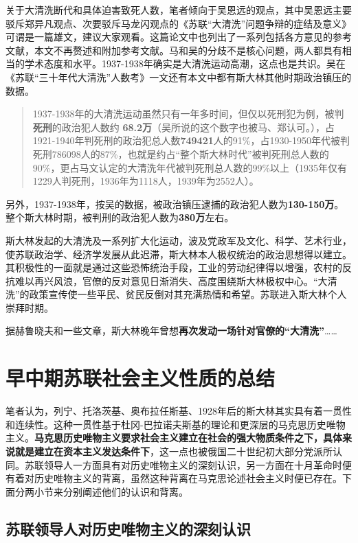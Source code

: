 \begin{enumerate}
  关于大清洗断代和具体迫害致死人数，笔者倾向于吴恩远的观点，其中吴恩远主要驳斥郑异凡观点、次要驳斥马龙闪观点的《苏联“大清洗”问题争辩的症结及意义》可谓是一篇雄文，建议大家观看。这篇论文中也列出了一系列包括各方意见的参考文献，本文不再赘述和附加参考文献。马和吴的分歧不是核心问题，两人都具有相当的学术态度和水平。1937-1938年确实是大清洗运动高潮，这点也是共识。吴在《苏联“三十年代大清洗”人数考》一文还有本文中都有斯大林其他时期政治镇压的数据。
  \begin{quotation} 1937-1938年的大清洗运动虽然只有一年多时间，但仅以死刑犯为例，被判\textbf{死刑}的政治犯人数约 \textbf{68.2万}（吴所说的这个数字也被马、郑认可。），占1921-1940年判死刑的政治犯总人数\textbf{749421}人的91\%，占1930-1950年代被判死刑786098人的87\%，也就是约占“整个斯大林时代”被判死刑总人数的90\%，更占马文认定的大清洗年代被判死刑总人数的99\%以上（1935年仅有1229人判死刑，1936年为1118人，1939年为2552人）。
  \end{quotation}另外，1937-1938年，按吴的数据，被政治镇压逮捕的政治犯人数为\textbf{130-150万}。整个斯大林时期，被判刑的政治犯人数为\textbf{380万}左右。\cite{wuenyuanzhengbian}

  斯大林发起的大清洗及一系列扩大化运动，波及党政军及文化、科学、艺术行业，使苏联政治学、经济学发展从此迟滞，斯大林本人极权统治的政治思想得以建立。其积极性的一面就是通过这些恐怖统治手段，工业的劳动纪律得以增强，农村的反抗难以再兴风浪，官僚的反对意见日渐消失、高度围绕斯大林极权中心。“大清洗”的政策宣传使一些平民、贫民反倒对其充满热情和希望。苏联进入斯大林个人崇拜时期。

  据赫鲁晓夫和一些文章，斯大林晚年曾想\textbf{再次发动一场针对官僚的“大清洗”}……
\end{enumerate}

\section{早中期苏联社会主义性质的总结}

笔者认为，列宁、托洛茨基、奥布拉任斯基、1928年后的斯大林其实具有着一贯性和连续性。这种一贯性基于杜冈-巴拉诺夫斯基的理论和更深层的马克思历史唯物主义。\textbf{马克思历史唯物主义要求社会主义建立在社会的强大物质条件之下，具体来说就是建立在资本主义发达条件下}，这一点也被俄国二十世纪初大部分党派所认同。苏联领导人一方面具有对历史唯物主义的深刻认识，另一方面在十月革命时便有着对历史唯物主义的背离，虽然这种背离在马克思论述社会主义时便已存在。下面分两小节来分别阐述他们的认识和背离。

\subsection{苏联领导人对历史唯物主义的深刻认识}


